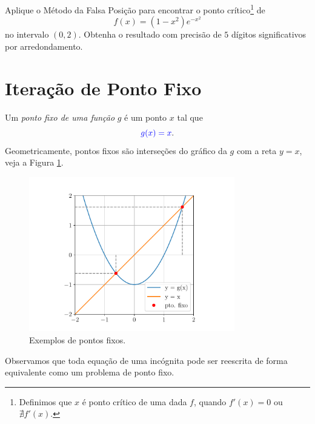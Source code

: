 \begin{exer}
  Aplique o Método da Falsa Posição para encontrar o ponto crítico\footnote{Definimos que $x$ é ponto crítico de uma dada $f$, quando $f'(x) = 0$ ou $\nexists f'(x)$.} de
  \begin{equation}
    f(x) = (1-x^2)e^{-x^2}
  \end{equation}
  no intervalo $(0, 2)$. Obtenha o resultado com precisão de $5$ dígitos significativos por arredondamento.
\end{exer}

\section{Iteração de Ponto Fixo}\label{cap_eq1d_sec_pfixo}

Um \emph{ponto fixo de uma função} $g$ é um ponto $x$ tal que
\begin{equation}
  {\color{blue}g(x) = x}.
\end{equation}
Geometricamente, pontos fixos são interseções do gráfico da $g$ com a reta $y=x$, veja a Figura \ref{cap_eq1d_sec_pfixo:fig:pfixo}.

\begin{figure}[H]
  \centering
  \includegraphics[width=0.8\textwidth]{./cap_eq1d/dados/fig_pfixo/fig}
  \caption{Exemplos de pontos fixos.}
  \label{cap_eq1d_sec_pfixo:fig:pfixo}
\end{figure}

Observamos que toda equação de uma incógnita pode ser reescrita de forma equivalente como um problema de ponto fixo.

